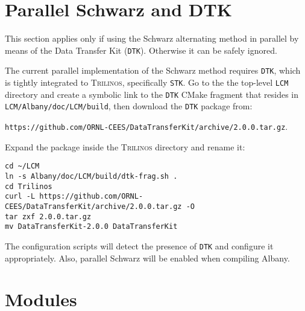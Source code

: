 \documentclass{article}
\newcommand{\trilinos}{\textsc{Trilinos}}
\begin{document}
\section{Parallel Schwarz and DTK}
\label{sec:dtk}

This section applies only if using the Schwarz alternating method in parallel by
means of the Data Transfer Kit (\verb+DTK+).  Otherwise it can be safely
ignored.

The current parallel implementation of the Schwarz method requires \verb+DTK+,
which is tightly integrated to \trilinos{}, specifically \verb+STK+. Go to the
the top-level \verb+LCM+ directory and create a symbolic link to the \verb+DTK+
CMake fragment that resides in \verb+LCM/Albany/doc/LCM/build+, then download
the \verb+DTK+ package from:

\verb+https://github.com/ORNL-CEES/DataTransferKit/archive/2.0.0.tar.gz+.

Expand the package inside the \trilinos{} directory and rename it:
\begin{verbatim}
cd ~/LCM
ln -s Albany/doc/LCM/build/dtk-frag.sh .
cd Trilinos
curl -L https://github.com/ORNL-CEES/DataTransferKit/archive/2.0.0.tar.gz -O
tar zxf 2.0.0.tar.gz
mv DataTransferKit-2.0.0 DataTransferKit
\end{verbatim}
The configuration scripts will detect the presence of \verb+DTK+ and
configure it appropriately. Also, parallel Schwarz will be enabled when
compiling Albany.

\section{Modules}
\label{sec:modules}
\end{document}

